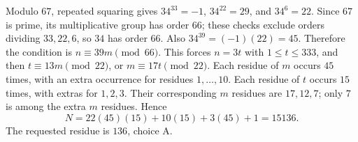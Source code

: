 Modulo $67$, repeated squaring gives $34^{33}=-1$, $34^{22}=29$, and $34^6=22$. Since $67$ is prime, its multiplicative group has order $66$; these checks exclude orders dividing $33,22,6$, so $34$ has order $66$. Also $34^{39}=(-1)(22)=45$. Therefore the condition is $n\equiv39m\pmod{66}$.
This forces $n=3t$ with $1\le t\le333$, and then $t\equiv13m\pmod{22}$, or $m\equiv17t\pmod{22}$. Each residue of $m$ occurs $45$ times, with an extra occurrence for residues $1,\ldots,10$. Each residue of $t$ occurs $15$ times, with extras for $1,2,3$. Their corresponding $m$ residues are $17,12,7$; only $7$ is among the extra $m$ residues. Hence
\[N=22(45)(15)+10(15)+3(45)+1=15136.\]
The requested residue is $\boxed{136}$, choice A.
